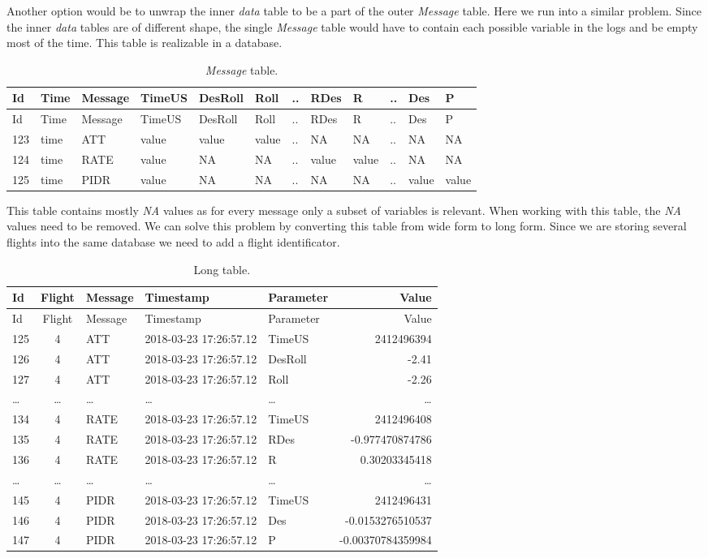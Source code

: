 \documentclass[12pt,oneside]{reedthesis}
\theoremstyle{definition}
\theoremstyle{definition}
\theoremstyle{definition}
\theoremstyle{remark}
\begin{document}
Another option would be to unwrap the inner \emph{data} table to be a
part of the outer \emph{Message} table. Here we run into a similar
problem. Since the inner \emph{data} tables are of different shape, the
single \emph{Message} table would have to contain each possible variable
in the logs and be empty most of the time. This table is realizable in a
database.
\begin{longtable}[]{@{}llllllllllll@{}}
\caption{\label{tab:message} \emph{Message} table.}\tabularnewline
\toprule
Id & Time & Message & TimeUS & DesRoll & Roll & .. & RDes & R & .. & Des
& P\tabularnewline
\midrule
\endfirsthead
\toprule
Id & Time & Message & TimeUS & DesRoll & Roll & .. & RDes & R & .. & Des
& P\tabularnewline
\midrule
\endhead
123 & time & ATT & value & value & value & .. & NA & NA & .. & NA &
NA\tabularnewline
124 & time & RATE & value & NA & NA & .. & value & value & .. & NA &
NA\tabularnewline
125 & time & PIDR & value & NA & NA & .. & NA & NA & .. & value &
value\tabularnewline
\bottomrule
\end{longtable}
This table contains mostly \emph{NA} values as for every message only a
subset of variables is relevant. When working with this table, the
\emph{NA} values need to be removed. We can solve this problem by
converting this table from wide form to long form. Since we are storing
several flights into the same database we need to add a flight
identificator.
\begin{longtable}[]{@{}lclllr@{}}
\caption{\label{tab:longtable} Long table.}\tabularnewline
\toprule
Id & Flight & Message & Timestamp & Parameter & Value\tabularnewline
\midrule
\endfirsthead
\toprule
Id & Flight & Message & Timestamp & Parameter & Value\tabularnewline
\midrule
\endhead
125 & 4 & ATT & 2018-03-23 17:26:57.12 & TimeUS &
2412496394\tabularnewline
126 & 4 & ATT & 2018-03-23 17:26:57.12 & DesRoll & -2.41\tabularnewline
127 & 4 & ATT & 2018-03-23 17:26:57.12 & Roll & -2.26\tabularnewline
\ldots{} & \ldots{} & \ldots{} & \ldots{} & \ldots{} &
\ldots{}\tabularnewline
134 & 4 & RATE & 2018-03-23 17:26:57.12 & TimeUS &
2412496408\tabularnewline
135 & 4 & RATE & 2018-03-23 17:26:57.12 & RDes &
-0.977470874786\tabularnewline
136 & 4 & RATE & 2018-03-23 17:26:57.12 & R &
0.30203345418\tabularnewline
\ldots{} & \ldots{} & \ldots{} & \ldots{} & \ldots{} &
\ldots{}\tabularnewline
145 & 4 & PIDR & 2018-03-23 17:26:57.12 & TimeUS &
2412496431\tabularnewline
146 & 4 & PIDR & 2018-03-23 17:26:57.12 & Des &
-0.0153276510537\tabularnewline
147 & 4 & PIDR & 2018-03-23 17:26:57.12 & P &
-0.00370784359984\tabularnewline
\bottomrule
\end{longtable}
\end{document}
